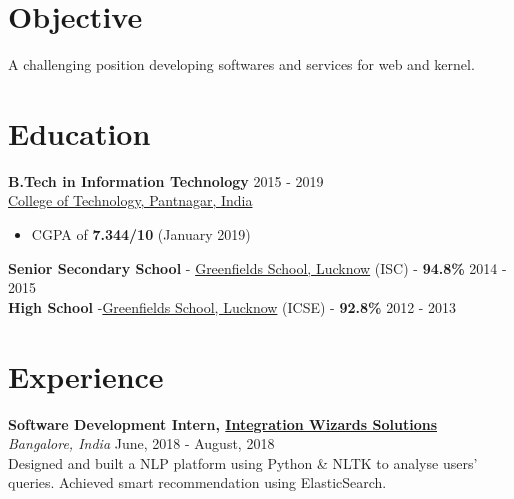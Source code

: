\documentclass[margin, centered] {res}
\begin{document}
\begin{resume}

\section{Objective}
A challenging position developing softwares and services for web and kernel.

\section{Education}
\textbf{B.Tech in Information Technology} \hfill 2015 - 2019 \\
\href{http://gbpuat-tech.ac.in}{College of Technology, Pantnagar, India}
\begin{itemize}
\item CGPA of {\textbf{{7.344}/10}} (January 2019)
\end{itemize}
\textbf{Senior Secondary School} - \href{http://www.greenfieldsschool.org.in/}{Greenfields School, Lucknow} (ISC) - \textbf{94.8\% }\hfill 2014 - 2015 \\
\textbf{High School} -\href{http://www.greenfieldsschool.org.in/} {Greenfields School, Lucknow} (ICSE) - \textbf{92.8\%} \hfill 2012 - 2013


\section{Experience}

\textbf{Software Development Intern, \href{http://iwizardsolutions.com/}{Integration Wizards Solutions}} \\
\emph{Bangalore, India} \hfill June, 2018 - August, 2018 \\
Designed and built a NLP platform using Python & NLTK to analyse users’ queries. Achieved smart recommendation using ElasticSearch.\


\end{resume}
\end{document}
